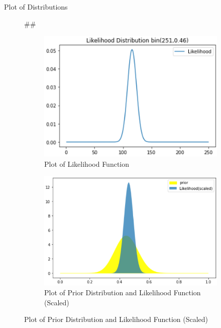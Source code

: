 \documentclass{beamer}
\newenvironment{subcolumns}[1]
 {\valign\bgroup\hsize=#1##\cr}
 {\crcr\egroup}
\newcommand{\nextsubcolumn} {\cr\noalign{\hfill}}
\begin{document}
\begin{frame}{Plot of Distributions}
\begin{figure}[htp]
\centering
\begin{subcolumns}{0.47\columnwidth}
  \begin{subfigure}{0.47\columnwidth}
  \centering
  \includegraphics[width=\textwidth]{Images/Likelihood_Dist.png}
  \caption{Plot of Likelihood Function}
  \end{subfigure}
\nextsubcolumn
  \begin{subfigure}{0.5\columnwidth}
  \centering
  \includegraphics[width=\textwidth]{Images/Prior_Likelihood.png}
  \caption{Plot of Prior Distribution and Likelihood Function (Scaled)}
  \end{subfigure}
\end{subcolumns}
\end{figure}  
\end{frame}
\end{document}
